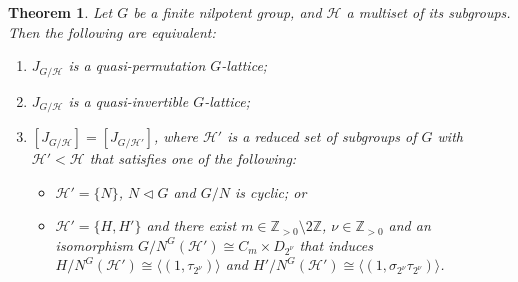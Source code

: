 \documentclass[12pt]{amsart}
\theoremstyle{plain}
\newtheorem{thm}{Theorem}[section]
\theoremstyle{definition}
\numberwithin{thm}{section}
\numberwithin{equation}{section}
\newcommand{\Zpn}{\mathbb{Z}_{>0}}
\newcommand{\Z}{\mathbb{Z}}
\newcommand{\cH}{\mathcal{H}}
\begin{document}
\begin{thm}\label{thm:mnnp}
Let $G$ be a finite nilpotent group, and $\cH$ a multiset of its subgroups. Then the following are equivalent: 
\begin{enumerate}
\item $J_{G/\cH}$ is a quasi-permutation $G$-lattice; 
\item $J_{G/\cH}$ is a quasi-invertible $G$-lattice; 
\item $[J_{G/\cH}]=[J_{G/\cH'}]$, where $\cH'$ is a reduced set of subgroups of $G$ with $\cH'<\cH$ that satisfies one of the following: 
\begin{itemize}
\item[(iii-$\alpha$)] $\cH'=\{N\}$, $N\triangleleft G$ and $G/N$ is cyclic; or
\item[(iii-$\beta$)] $\cH'=\{H,H'\}$ and there exist $m\in \Zpn \setminus 2\Z$, $\nu\in \Zpn$ and an isomorphism $G/N^{G}(\cH')\cong C_{m}\times D_{2^{\nu}}$ that induces $H/N^{G}(\cH')\cong \langle (1,\tau_{2^{\nu}})\rangle$ and $H'/N^{G}(\cH')\cong \langle (1,\sigma_{2^{\nu}}\tau_{2^{\nu}})\rangle$. 
\end{itemize}
\end{enumerate}
\end{thm}
\end{document}

